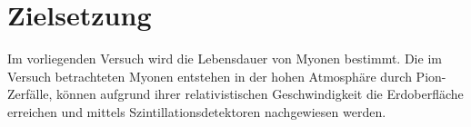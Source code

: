 \section{Zielsetzung}
\label{sec:Zielsetzung}
Im vorliegenden Versuch wird die Lebensdauer von Myonen bestimmt. Die im Versuch betrachteten Myonen entstehen in der hohen Atmosphäre durch Pion-Zerfälle, können aufgrund ihrer relativistischen Geschwindigkeit die Erdoberfläche erreichen und mittels Szintillationsdetektoren nachgewiesen werden.
